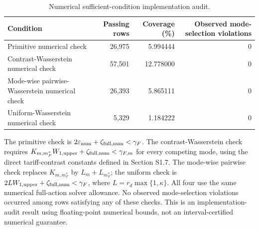 \begingroup
\small
\setlength{\tabcolsep}{5pt}
\renewcommand{\arraystretch}{1.15}
\begin{table}[tbp]
\centering
\caption{Numerical sufficient-condition implementation audit.}
\label{tab:numerical-sufficient-condition-audit}
\begin{tabular}{@{}lrrr@{}}
\toprule
Condition & Passing rows & Coverage (\%) & Observed mode-selection violations \\
\midrule
Primitive numerical check & 26,975 & 5.994444 & 0 \\
Contrast-Wasserstein numerical check & 57,501 & 12.778000 & 0 \\
Mode-wise pairwise-Wasserstein numerical check & 26,393 & 5.865111 & 0 \\
Uniform-Wasserstein numerical check & 5,329 & 1.184222 & 0 \\
\bottomrule
\end{tabular}
\par\smallskip
\begin{minipage}{\linewidth}\footnotesize The primitive check is $2\varepsilon_{\rm num}+\zeta_{\rm full,num}<\gamma_F$. The contrast-Wasserstein check requires $K_{m,m_F^*}W_{1,\rm upper}+\zeta_{\rm full,num}<\gamma_{F,m}$ for every competing mode, using the direct tariff-contrast constants defined in Section S1.7. The mode-wise pairwise check replaces $K_{m,m_F^*}$ by $L_m+L_{m_F^*}$; the uniform check is $2LW_{1,\rm upper}+\zeta_{\rm full,num}<\gamma_F$, where $L=r_d\max\{1,\kappa\}$. All four use the same numerical full-action solver allowance. No observed mode-selection violations occurred among rows satisfying any of these checks. This is an implementation-audit result using floating-point numerical bounds, not an interval-certified numerical guarantee.\end{minipage}
\end{table}
\endgroup
